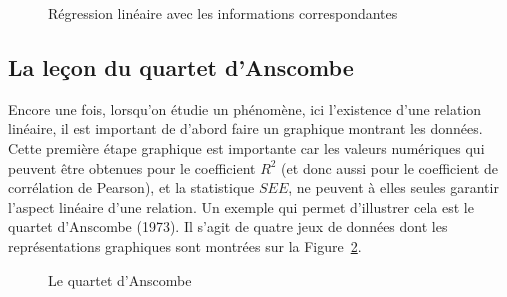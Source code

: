 \documentclass[
  letterpaper,
]{book}
\begin{document}
\begin{figure}[H]


\caption{\label{fig-graphLinStats}Régression linéaire avec les
informations correspondantes}

\end{figure}%

\subsection{La leçon du quartet
d'Anscombe}\label{la-leuxe7on-du-quartet-danscombe}

Encore une fois, lorsqu'on étudie un phénomène, ici l'existence d'une
relation linéaire, il est important de d'abord faire un graphique
montrant les données. Cette première étape graphique est importante car
les valeurs numériques qui peuvent être obtenues pour le coefficient
\(R^2\) (et donc aussi pour le coefficient de corrélation de Pearson),
et la statistique \(SEE\), ne peuvent à elles seules garantir l'aspect
linéaire d'une relation. Un exemple qui permet d'illustrer cela est le
quartet d'Anscombe (1973). Il s'agit de quatre jeux de données dont les
représentations graphiques sont montrées sur la
Figure~\ref{fig-anscombeQuartetGraph}.

\begin{figure}


\caption{\label{fig-anscombeQuartetGraph}Le quartet d'Anscombe}

\end{figure}%
\end{document}
